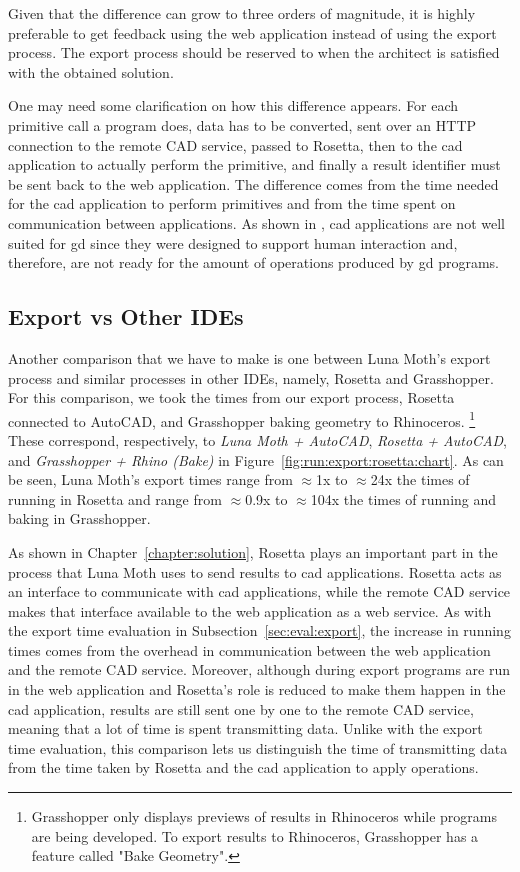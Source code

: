 Given that the difference can grow to three orders of magnitude, it is highly preferable to get feedback using the web application instead of using the export process.
The export process should be reserved to when the architect is satisfied with the obtained solution.

One may need some clarification on how this difference appears.
For each primitive call a program does, data has to be converted, sent over an HTTP connection to the remote CAD service, passed to Rosetta, then to the \gls{cad} application to actually perform the primitive, and finally a result identifier must be sent back to the web application.
The difference comes from the time needed for the \gls{cad} application to perform primitives and from the time spent on communication between applications.
As shown in \cite{Leitao2014illustrated}, \gls{cad} applications are not well suited for \gls{gd} since they were designed to support human interaction and, therefore, are not ready for the amount of operations produced by \gls{gd} programs.


\subsection{Export vs Other IDEs}
Another comparison that we have to make is one between Luna Moth's export process and similar processes in other IDEs, namely, Rosetta and Grasshopper.
For this comparison, we took the times from our export process, Rosetta connected to AutoCAD, and Grasshopper baking geometry to Rhinoceros.%
\footnote{Grasshopper only displays previews of results in Rhinoceros while programs are being developed. To export results to Rhinoceros, Grasshopper has a feature called "Bake Geometry".}
These correspond, respectively, to \textit{Luna Moth + AutoCAD}, \textit{Rosetta + AutoCAD}, and \textit{Grasshopper + Rhino (Bake)} in Figure~\ref{fig:run:export:rosetta:chart}.
As can be seen, Luna Moth's export times range from $\approx$1x to $\approx$24x the times of running in Rosetta and range from $\approx$0.9x to $\approx$104x the times of running and baking in Grasshopper.

As shown in Chapter~\ref{chapter:solution}, Rosetta plays an important part in the process that Luna Moth uses to send results to \gls{cad} applications.
Rosetta acts as an interface to communicate with \gls{cad} applications, while the remote CAD service makes that interface available to the web application as a web service.
As with the export time evaluation in Subsection~\ref{sec:eval:export}, the increase in running times comes from the overhead in communication between the web application and the remote CAD service.
Moreover, although during export programs are run in the web application and Rosetta's role is reduced to make them happen in the \gls{cad} application, results are still sent one by one to the remote CAD service, meaning that a lot of time is spent transmitting data.
Unlike with the export time evaluation, this comparison lets us distinguish the time of transmitting data from the time taken by Rosetta and the \gls{cad} application to apply operations.


